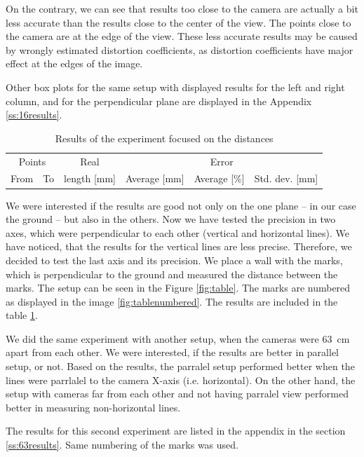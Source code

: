 On the contrary, we can see that results too close to the camera are actually a
bit less accurate than the results close to the center of the view. The points
close to the camera are at the edge of the view. These less accurate results
may be caused by wrongly estimated distortion coefficients, as distortion
coefficients have major effect at the edges of the image.

Other box plots for the same setup with displayed results for the left and
right column, and for the perpendicular plane are displayed in the Appendix
\ref{ss:16results}.

\begin{table}
\centering
\begin{tabular}{|r|r|r|r|r|r|}
\hline
\multicolumn{2}{|c|}{Points} & \multicolumn{1}{c|}{Real} & \multicolumn{3}{c|}{Error} \\ 
\cline{1-2} \cline{4-6}
From & To & length [mm] & Average [mm] & Average [\%] & Std. dev. [mm]\\
\hline
\hline

\hline
\end{tabular}
\caption{Results of the experiment focused on the distances}
\label{table:distances}
\end{table}

We were interested if the results are good not only on the one plane -- in our
case the ground -- but also in the others. Now we have tested the precision in
two axes, which were perpendicular to each other (vertical and horizontal
lines). We have noticed, that the results for the vertical lines are less
precise. Therefore, we decided to test the last axis and its precision. We place
a wall with the marks, which is perpendicular to the ground and measured the
distance between the marks. The setup can be seen in the Figure
\ref{fig:table}. The marks are numbered as displayed in the image
\ref{fig:tablenumbered}. The results are included in the table
\ref{table:distances}. 

We did the same experiment with another setup, when the cameras were 63~cm
apart from each other. We were interested, if the results are better in
parallel setup, or not. Based on the results, the parralel setup performed
better when the lines were parrlalel to the camera X-axis (i.e. horizontal). On
the other hand, the setup with cameras far from each other and not having
parralel view performed better in measuring non-horizontal lines. 


The results for this second experiment are listed in the appendix in the
section \ref{ss:63results}. Same numbering of the marks was used.

